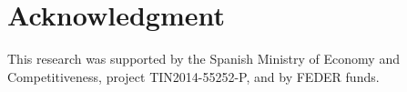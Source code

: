 \documentclass[preprint,12pt]{elsarticle}
\begin{document}
\section*{Acknowledgment}

This research was supported by the Spanish Ministry of Economy and Competitiveness, project TIN2014-55252-P, and by FEDER funds.



\end{document}
